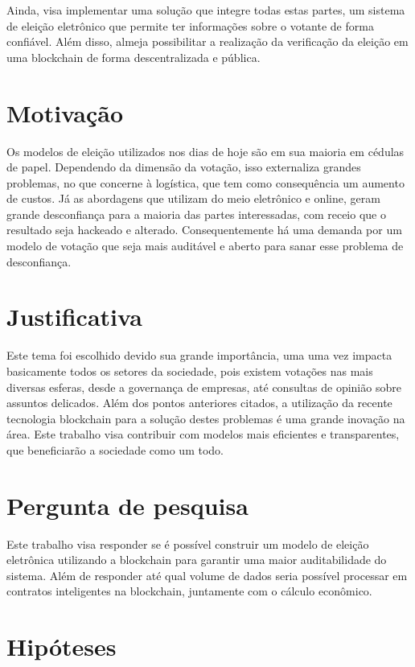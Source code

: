\documentclass{ufsctex/ufsctex}
\begin{document}
Ainda, visa implementar uma solução que integre todas estas partes, um sistema
de eleição eletrônico que permite ter informações sobre o votante de forma
confiável. Além disso, almeja possibilitar a realização da verificação da eleição
em uma blockchain de forma descentralizada e pública.

\section{Motivação}

Os modelos de eleição utilizados nos dias de hoje são em sua maioria em cédulas
de papel. Dependendo da dimensão da votação, isso externaliza grandes problemas,
no que concerne à logística, que tem como consequência um aumento de custos. Já
as abordagens que utilizam do meio eletrônico e online, geram grande
desconfiança para a maioria das partes interessadas, com receio que o resultado
seja hackeado e alterado. Consequentemente há uma demanda por um modelo de
votação que seja mais auditável e aberto para sanar esse problema de
desconfiança.

\section{Justificativa}

Este tema foi escolhido devido sua grande importância, uma uma vez impacta
basicamente todos os setores da sociedade, pois existem votações nas mais
diversas esferas, desde a governança de empresas, até consultas de opinião sobre
assuntos delicados.  Além dos pontos anteriores citados, a utilização da recente
tecnologia blockchain para a solução destes problemas é uma grande inovação na
área. Este trabalho visa contribuir com modelos mais eficientes e transparentes,
que beneficiarão a sociedade como um todo.

\section{Pergunta de pesquisa}

Este trabalho visa responder se é possível construir um modelo de eleição
eletrônica utilizando a blockchain para garantir uma maior auditabilidade do
sistema. Além de responder até qual volume de dados seria possível processar em
contratos inteligentes na blockchain, juntamente com o cálculo econômico.

\section{Hipóteses}
\end{document}
